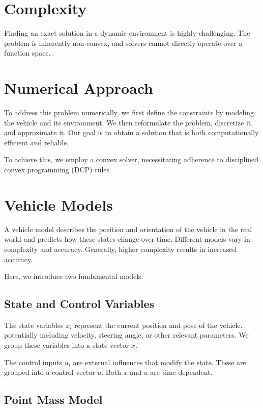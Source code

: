 \section{Complexity}

Finding an exact solution in a dynamic environment is highly challenging.
The problem is inherently non-convex, and solvers cannot directly operate over a function space.

\section{Numerical Approach}

To address this problem numerically, we first define the constraints by modeling the vehicle and its environment.
We then reformulate the problem, discretize it, and approximate it.
Our goal is to obtain a solution that is both computationally efficient and reliable.

To achieve this, we employ a convex solver, necessitating adherence to disciplined convex programming (DCP) rules.

\section{Vehicle Models}

A vehicle model describes the position and orientation of the vehicle in the real world and predicts how these states change over time.
Different models vary in complexity and accuracy.
Generally, higher complexity results in increased accuracy.

Here, we introduce two fundamental models.

\subsection{State and Control Variables}

The state variables $x_i$ represent the current position and pose of the vehicle, potentially including velocity, steering angle, or other relevant
parameters.
We group these variables into a state vector $x$.

The control inputs $u_i$ are external influences that modify the state.
These are grouped into a control vector $u$.
Both $x$ and $u$ are time-dependent.

\subsection{Point Mass Model}

